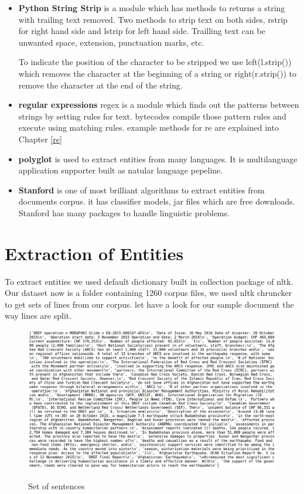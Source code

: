 \begin{itemize}
\item \textbf{Python String Strip} is a module which has methods to  returns a string with trailing text removed. Two methods to strip text on both sides, rstrip for right hand side and lstrip for left hand side. Trailling text can be  unwanted space, extension, punctuation marks, etc.

To indicate the position of the character to be stripped we use left(l.strip()) which removes the character at the beginning of a string or right(r.strip()) to remove the character at the end of the string.
\item \textbf{regular expressions } regex is a module which finds out the patterns between strings by setting rules for text. bytecodes compile those pattern rules and execute using matching rules.  example methods for re are explained into Chapter \ref{re}
\item \textbf{polyglot} is used to extract entities from many languages.  It is multilanguage application supporter built as natular language pepeline.
\item \textbf{Stanford} is one of most brilliant algorithms to extract entities from  documents corpus. it has classifier models, jar files which are free downloads. Stanford has many packages to handle linguistic problems. 
\end{itemize}

\section{Extraction of Entities }

To extract entities we used default dictionary built in collection package of nltk. Our dataset now is a folder containing 1260 corpus files, we  used nltk chruncker to get sets of lines  from our corpus. let have a look for our sample document the way lines are split.
\begin{figure}[hbtp]
\caption{Set of sentences}
\centering
\includegraphics[scale=0.4]{images/corpus.png}\label{Set of sentences}
\end{figure}


